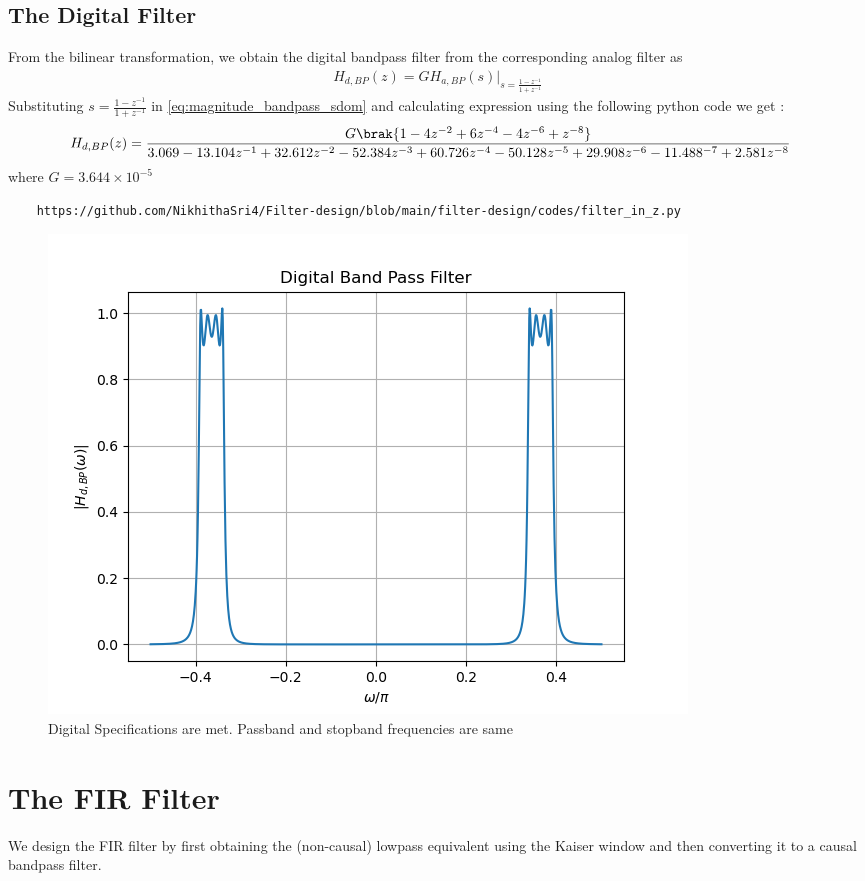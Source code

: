 \documentclass{article}
\begin{document}
\subsection{The Digital Filter}
From the bilinear transformation, we obtain the digital bandpass filter from the corresponding analog filter as
\begin{align}
    H_{d,BP}(z) = GH_{a,BP}(s)\vert_{s = \frac{1-z^{-1}}{1 + z^{-1}}}
\end{align}
Substituting $s=\frac{1-z^{-1}}{1+z^{-1}}$ in \eqref{eq:magnitude_bandpass_sdom} and calculating expression using the following python code we get :
\begin{align}
    H_{d,BP}(z) &= \frac{G\brak{1 - 4z^{-2} + 6z^{-4} - 4z^{-6} + z^{-8}}}{3.069 - 13.104z^{-1} + 32.612z^{-2} - 52.384z^{-3} + 60.726z^{-4} - 50.128z^{-5} + 29.908z^{-6} - 11.488^{-7} + 2.581z^{-8}}
\end{align}
where $G=3.644\times 10^{-5}$    
\begin{lstlisting}
    https://github.com/NikhithaSri4/Filter-design/blob/main/filter-design/codes/filter_in_z.py
\end{lstlisting}
\begin{figure}[H]
\centering
\includegraphics[width=1\columnwidth]{figs/Digital_BPF.png}
\caption{Digital Specifications are met. Passband and stopband frequencies are same}
\label{fig:Digital_BFP}
\end{figure}
\section{The FIR Filter}
We design the FIR filter by first obtaining the (non-causal) lowpass equivalent using the Kaiser window
and then
converting it to a causal bandpass filter.
\end{document}
